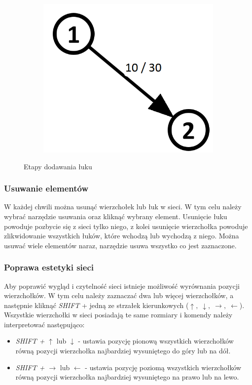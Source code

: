 \begin{figure}[h]
\begin{subfigure}{0.28\textwidth}
		\includegraphics[width=0.9\linewidth]{./img/spec_zew03_3.png}
		\label{fig:addEdge3}
	\end{subfigure}
	\caption{Etapy dodawania łuku}
	\label{fig:addEdge}
\end{figure}
\subsubsection{Usuwanie elementów}
W każdej chwili można usunąć wierzchołek lub łuk w sieci. W tym celu należy wybrać narzędzie usuwania oraz kliknąć wybrany element. Usunięcie łuku powoduje pozbycie się z sieci tylko niego, z kolei usunięcie wierzchołka powoduje zlikwidowanie wszystkich łuków, które wchodzą lub wychodzą z niego. Można usuwać wiele elementów naraz, narzędzie usuwa wszystko co jest zaznaczone. 
\subsubsection{Poprawa estetyki sieci}
Aby poprawić wygląd i czytelność sieci istnieje możliwość wyrównania pozycji wierzchołków. W tym celu należy zaznaczać dwa lub więcej wierzchołków, a następnie kliknąć \textit{SHIFT} + jedną ze strzałek kierunkowych ($ \uparrow,\;\downarrow,\;\rightarrow,\;\leftarrow $). Wszystkie wierzchołki w sieci posiadają te same rozmiary i komendy należy interpretować następująco:
\begin{itemize}
	\item \textit{SHIFT + $ \uparrow $} lub $ \downarrow $ - ustawia pozycję pionową wszystkich wierzchołków równą pozycji wierzchołka najbardziej wysuniętego do góry lub na dół.
	\item \textit{SHIFT + $ \rightarrow $} lub $ \leftarrow $ - ustawia pozycję poziomą wszystkich wierzchołków równą pozycji wierzchołka najbardziej wysuniętego na prawo lub na lewo.
\end{itemize}
